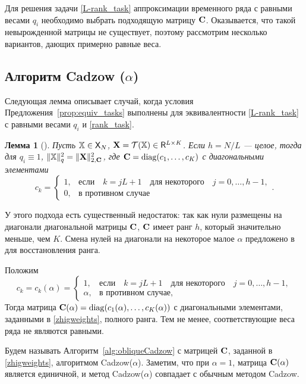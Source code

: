 \documentclass[12pt, specialist, subf,href,colorlinks=true,substylefile = spbu.rtx]{disser}
\newtheorem{lemma}{Лемма}
\theoremstyle{remark}
\theoremstyle{definition}
\begin{document}
Для решения задачи \eqref{L-rank_task} аппроксимации временного ряда с равными весами $q_i$ необходимо выбрать подходящую матрицу $\mathbf{C}$. Оказывается, что такой невырожденной матрицы не существует, поэтому рассмотрим несколько вариантов, дающих примерно равные веса.

\subsection{Алгоритм Cadzow ($\alpha$)}
\label{sec:cadzow_alpha}
Следующая лемма описывает случай, когда условия Предложения~\ref{prop:equiv_tasks} выполнены для эквивалентности \eqref{L-rank_task} с равными весами $q_i$ и \eqref{rank_task}.

\begin{lemma}[\cite{Gillard2014}]
\label{zhiglemma}
Пусть $\mathbb{X} \in \mathsf{X}_N$, $\mathbf{X} = \mathcal{T}(\mathbb{X}) \in \mathsf{R}^{L \times K}$. Если $h = N/L$ --- целое, тогда для $q_i\equiv 1$,  $\|\mathbb{X}\|^2_q = \|\mathbf{X}\|^2_{2, \mathbf{C}}$, где $\mathbf{C}=\mathop{\mathrm{diag}}(c_1,\ldots,c_K)$ с диагональными элементами
\begin{equation*}
c_k = \begin{cases}
1, & \text{если} \quad k = jL+1 \quad \text{для некоторого} \quad j = 0, \ldots, h-1, \\
0, & \text{в противном случае}
\end{cases}.
\end{equation*}
\end{lemma}

У этого подхода есть существенный недостаток: так как нули размещены на диагонали диагональной матрицы $\mathbf{C}$, $\mathbf{C}$ имеет ранг $h$, который значительно меньше, чем $K$. Смена нулей на диагонали на некоторое малое $\alpha$ предложено в \cite{Gillard2014} для восстановления ранга.

Положим
\begin{equation}\label{zhigweights}
c_k = c_k(\alpha) = \begin{cases}
1, & \text{если} \quad k = jL+1 \quad \text{для некоторого} \quad j = 0, \ldots, h-1, \\
\alpha, & \text{в противном случае,}
\end{cases}
\end{equation}
Тогда матрица $\mathbf{C}(\alpha)=\mathop{\mathrm{diag}}(c_1(\alpha),\ldots,c_K(\alpha))$ с диагональными элементами, заданными в \eqref{zhigweights}, полного ранга.
Тем не менее, соответствующие веса ряда не являются равными.

Будем называть Алгоритм~\ref{alg:obliqueCadzow} с матрицей $\mathbf{C}$, заданной в \eqref{zhigweights}, алгоритмом Cadzow($\alpha$). Заметим, что при $\alpha = 1$, матрица $\mathbf{C}(\alpha)$ является единичной, и метод Cadzow($\alpha$) совпадает с обычным методом Cadzow.
\end{document}
